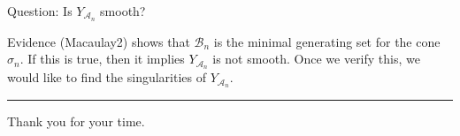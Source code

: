 \documentclass[mathserif
    , handout
   ]{beamer}
\theoremstyle{plain}
\theoremstyle{definition}
\theoremstyle{remark}
\begin{document}
\begin{frame}%
{}{}
{\color{GTblue}Question:} Is $Y_{\mathscr A_n}$ smooth?

\pause
\vspace{0.75pc}
Evidence (Macaulay2) shows that $\mathscr B_n$ is the minimal generating set for the cone $\sigma_n$.  If this is true, then it implies $Y_{\mathscr A_n}$ is not smooth.  Once we verify this, we would like to find the singularities of $Y_{\mathscr A_n}$.

\pause
\vspace{0.75pc}
\hrule

\pause
\begin{flushright}
{\color{GTtechgold}Thank you for your time.}
\end{flushright}

\end{frame}
\end{document}
